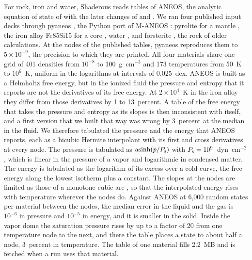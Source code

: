 \documentclass[twocolumn]{aastex701}
\begin{document}
For rock, iron and water, Shaderous reads tables of ANEOS, the analytic equation of state of \citet{ThompsonLauson1972} with the later changes of \citet{Melosh2007} and \citet{Stewart2020}. We ran four published input decks through pyaneos \citep{StewartPyaneos2026}, the Python port of M-ANEOS \citep{ThompsonMANEOS2019}: pyrolite for a mantle \citep{StewartPyrolite2022}, the iron alloy Fe85Si15 for a core \citep{StewartFe85Si15_2020}, water \citep{StewartWater2024}, and forsterite \citep{StewartForsterite2019}, the rock of older calculations. At the nodes of the published tables, pyaneos reproduces them to $5\times10^{-9}$, the precision to which they are printed. All four materials share one grid of 401 densities from $10^{-8}$ to 100~g~cm$^{-3}$ and 173 temperatures from 50~K to $10^6$~K, uniform in the logarithms at intervals of 0.025~dex. ANEOS is built as a Helmholtz free energy, but in the ionized fluid the pressure and entropy that it reports are not the derivatives of its free energy. At $2\times10^4$~K in the iron alloy they differ from those derivatives by 1 to 13~percent. A table of the free energy that takes the pressure and entropy as its slopes is then inconsistent with itself, and a first version that we built that way was wrong by 3~percent at the median in the fluid. We therefore tabulated the pressure and the energy that ANEOS reports, each as a bicubic Hermite interpolant with its first and cross derivatives at every node. The pressure is tabulated as $\operatorname{asinh}(p/P_{\rm s})$ with $P_{\rm s} = 10^9$~dyn~cm$^{-2}$, which is linear in the pressure of a vapor and logarithmic in condensed matter. The energy is tabulated as the logarithm of its excess over a cold curve, the free energy along the lowest isotherm plus a constant. The slopes at the nodes are limited as those of a monotone cubic are \citep{FritschCarlson1980}, so that the interpolated energy rises with temperature wherever the nodes do. Against ANEOS at 6,000 random states per material between the nodes, the median error in the liquid and the gas is $10^{-6}$ in pressure and $10^{-5}$ in energy, and it is smaller in the solid. Inside the vapor dome the saturation pressure rises by up to a factor of 20 from one temperature node to the next, and there the table places a state to about half a node, 3~percent in temperature. The table of one material fills 2.2~MB and is fetched when a run uses that material.
\end{document}
